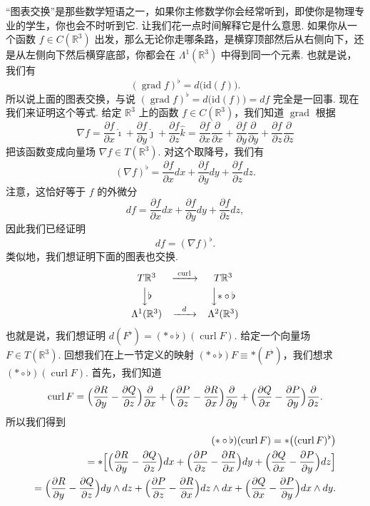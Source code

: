 ``图表交换''是那些数学短语之一，如果你主修数学你会经常听到，即使你是物理专业的学生，你也会不时听到它. 让我们花一点时间解释它是什么意思. 如果你从一个函数 $f\in C(\mathbb{R}^3)$ 出发，那么无论你走哪条路，是横穿顶部然后从右侧向下，还是从左侧向下然后横穿底部，你都会在 $\Lambda^1(\mathbb{R}^3)$ 中得到同一个元素. 也就是说，我们有
\[
(\operatorname{grad}f)^{\flat}=d\bigl(\mathrm{id}(f)\bigr).
\]
所以说上面的图表交换，与说 $(\operatorname{grad}f)^{\flat}=d\bigl(\mathrm{id}(f)\bigr)=df$ 完全是一回事. 现在我们来证明这个等式. 给定 $\mathbb{R}^3$ 上的函数 $f\in C(\mathbb{R}^3)$，我们知道 $\operatorname{grad}$ 根据
\[
\nabla f=\frac{\partial f}{\partial x}\hat{\imath}+\frac{\partial f}{\partial y}\hat{\jmath}+\frac{\partial f}{\partial z}\hat{k}
=\frac{\partial f}{\partial x}\frac{\partial}{\partial x}+\frac{\partial f}{\partial y}\frac{\partial}{\partial y}+\frac{\partial f}{\partial z}\frac{\partial}{\partial z}
\]
把该函数变成向量场 $\nabla f\in T(\mathbb{R}^3)$. 对这个取降号，我们有
\[
(\nabla f)^{\flat}=\frac{\partial f}{\partial x}dx+\frac{\partial f}{\partial y}dy+\frac{\partial f}{\partial z}dz.
\]
注意，这恰好等于 $f$ 的外微分
\[
df=\frac{\partial f}{\partial x}dx+\frac{\partial f}{\partial y}dy+\frac{\partial f}{\partial z}dz,
\]
因此我们已经证明
\[
df=(\nabla f)^{\flat}.
\]
类似地，我们想证明下面的图表也交换.
\[
\begin{array}{ccc}
T\mathbb{R}^3&\xrightarrow{\ \operatorname{curl}\ }&T\mathbb{R}^3\\[3pt]
\Big\downarrow \flat&&\Big\downarrow {\ast\circ\flat}\\[3pt]
\Lambda^1(\mathbb{R}^3)&\xrightarrow{\ \ d\ \ }&\Lambda^2(\mathbb{R}^3)
\end{array}
\]
也就是说，我们想证明 $d(F^{\flat})=(\ast\circ\flat)(\operatorname{curl}F)$. 给定一个向量场 $F\in T(\mathbb{R}^3)$. 回想我们在上一节定义的映射 $(\ast\circ\flat)F\equiv\ast(F^{\flat})$，我们想求 $(\ast\circ\flat)(\operatorname{curl}F)$. 首先，我们知道
\[
\operatorname{curl}F=\Bigl(\frac{\partial R}{\partial y}-\frac{\partial Q}{\partial z}\Bigr)\frac{\partial}{\partial x}+\Bigl(\frac{\partial P}{\partial z}-\frac{\partial R}{\partial x}\Bigr)\frac{\partial}{\partial y}+\Bigl(\frac{\partial Q}{\partial x}-\frac{\partial P}{\partial y}\Bigr)\frac{\partial}{\partial z}.
\]
所以我们得到
\begin{align*}
(\ast\circ\flat)(\operatorname{curl}F)=\ast\bigl((\operatorname{curl}F)^{\flat}\bigr) \\
=\ast\Bigl[\Bigl(\frac{\partial R}{\partial y}-\frac{\partial Q}{\partial z}\Bigr)dx+\Bigl(\frac{\partial P}{\partial z}-\frac{\partial R}{\partial x}\Bigr)dy+\Bigl(\frac{\partial Q}{\partial x}-\frac{\partial P}{\partial y}\Bigr)dz\Bigr] \\
=\Bigl(\frac{\partial R}{\partial y}-\frac{\partial Q}{\partial z}\Bigr)dy\wedge dz+\Bigl(\frac{\partial P}{\partial z}-\frac{\partial R}{\partial x}\Bigr)dz\wedge dx+\Bigl(\frac{\partial Q}{\partial x}-\frac{\partial P}{\partial y}\Bigr)dx\wedge dy.
\end{align*}

